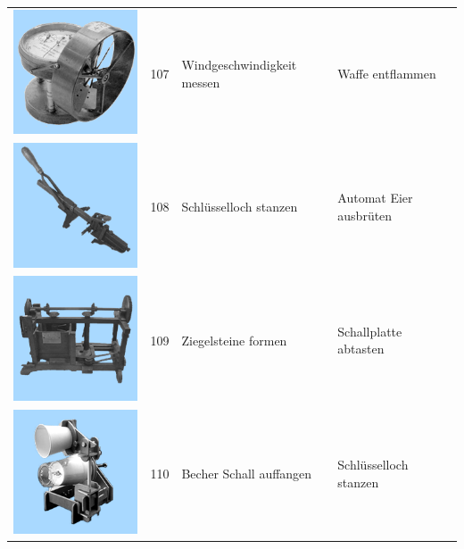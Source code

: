 \documentclass[
  english,
  doc,12pt,twoside,floatsintext]{apa7}
\begin{document}
\begin{center}
\begin{ThreePartTable}
\begin{longtable}{llll}
\includegraphics[valign=c, scale=0.19]{../materials/unfamiliar/107.png} & 107 & Windgeschwindigkeit messen & Waffe entflammen\\
\includegraphics[valign=c, scale=0.19]{../materials/unfamiliar/108.png} & 108 & Schlüsselloch stanzen & Automat Eier ausbrüten\\
\includegraphics[valign=c, scale=0.19]{../materials/unfamiliar/109.png} & 109 & Ziegelsteine formen & Schallplatte abtasten\\
\includegraphics[valign=c, scale=0.19]{../materials/unfamiliar/110.png} & 110 & Becher Schall auffangen & Schlüsselloch stanzen\\

\end{longtable}
\end{ThreePartTable}
\end{center}
\end{document}
